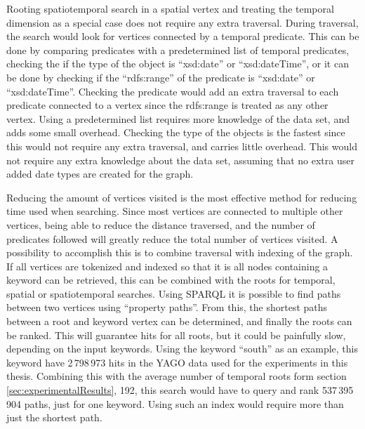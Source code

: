 Rooting spatiotemporal search in a spatial vertex and treating the temporal dimension as a special case does not require any extra traversal. During traversal, the search would look for vertices connected by a temporal predicate. This can be done by comparing predicates with a predetermined list of temporal predicates, checking the if the type of the object is ``xsd:date'' or ``xsd:dateTime'', or it can be done by checking if the ``rdfs:range'' of the predicate is ``xsd:date'' or ``xsd:dateTime''. Checking the predicate would add an extra traversal to each predicate connected to a vertex since the rdfs:range is treated as any other vertex. Using a predetermined list requires more knowledge of the data set, and adds some small overhead. Checking the type of the objects is the fastest since this would not require any extra traversal, and carries little overhead. This would not require any extra knowledge about the data set, assuming that no extra user added date types are created for the graph.

Reducing the amount of vertices visited is the most effective method for reducing time used when searching. Since most vertices are connected to multiple other vertices, being able to reduce the distance traversed, and the number of predicates followed will greatly reduce the total number of vertices visited. A possibility to accomplish this is to combine traversal with indexing of the graph. If all vertices are tokenized and indexed so that it is all nodes containing a keyword can be retrieved, this can be combined with the roots for temporal, spatial or spatiotemporal searches. Using SPARQL it is possible to find paths between two vertices using ``property paths''. From this, the shortest paths between a root and keyword vertex can be determined, and finally the roots can be ranked. This will guarantee hits for all roots, but it could be painfully slow, depending on the input keywords. Using the keyword ``south'' as an example, this keyword have 2\,798\,973 hits in the YAGO data used for the experiments in this thesis. Combining this with the average number of temporal roots form section \ref{sec:experimentalResults}, 192, this search would have to query and rank 537\,395\,904 paths, just for one keyword. Using such an index would require more than just the shortest path.

